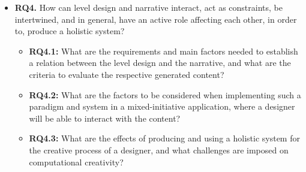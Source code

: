 


\begin{itemize}
    \item[] \textbf{RQ4.} How can level design and narrative interact, act as constraints, be intertwined, and in general, have an active role affecting each other, in order to, produce a holistic system?
    \begin{itemize}
        \item[] \textbf{RQ4.1:} What are the requirements and main factors needed to establish a relation between the level design and the narrative, and what are the criteria to evaluate the respective generated content? 
        \item[] \textbf{RQ4.2:} What are the factors to be considered when implementing such a paradigm and system in a mixed-initiative application, where a designer will be able to interact with the content?
        \item[] \textbf{RQ4.3:} What are the effects of producing and using a holistic system for the creative process of a designer, and what challenges are imposed on computational creativity? 
    \end{itemize}
\end{itemize}






